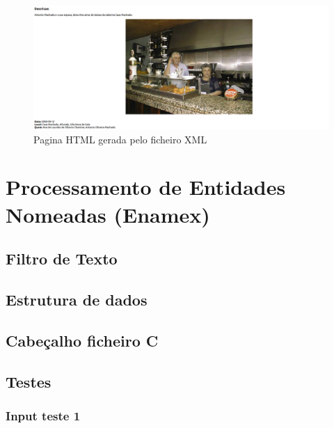 \label{seq:anex-museu-test-out04-03}


\begin{figure}[H]
\centering
\includegraphics[width=15cm]{anexos/2-1/Exemplo4/Screenshots/pag2_2.png}
\caption{Pagina HTML gerada pelo ficheiro XML}
\end{figure}

\section{Processamento de Entidades Nomeadas (Enamex)}
\label{seq:anex-enamex}

\subsection{Filtro de Texto}
\label{seq:anex-enamex-filtro}


\subsection{Estrutura de dados}
\label{seq:anex-enamex-est}


\subsection{Cabeçalho ficheiro C}
\label{seq:anex-enamex-header}



\subsection{Testes}
\label{seq:anex-enamex-test}
\subsubsection{Input teste 1}
\label{seq:anex-enamex-test-in01}


